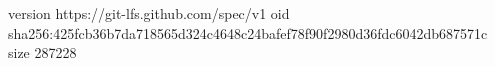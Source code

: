 version https://git-lfs.github.com/spec/v1
oid sha256:425fcb36b7da718565d324c4648c24bafef78f90f2980d36fdc6042db687571c
size 287228
